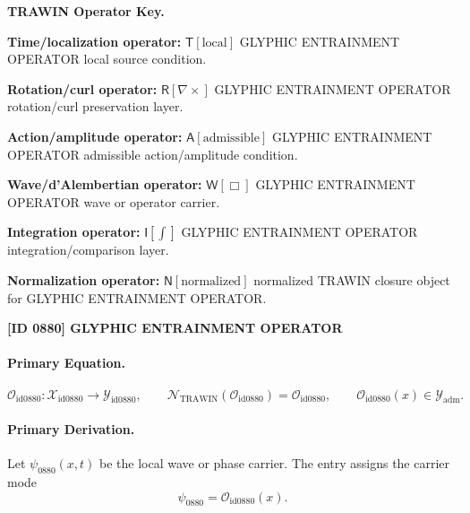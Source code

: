 \par\vspace{0.45\baselineskip}
\noindent\begin{minipage}[t]{\linewidth}
\begingroup
\small
\raggedright
\textbf{TRAWIN Operator Key.}\par
\noindent\textbf{Time/localization operator:} $\mathsf{T}\!\left[\mathrm{local}\right]$ GLYPHIC ENTRAINMENT OPERATOR local source condition.\par
\noindent\textbf{Rotation/curl operator:} $\mathsf{R}\!\left[\nabla\times\right]$ GLYPHIC ENTRAINMENT OPERATOR rotation/curl preservation layer.\par
\noindent\textbf{Action/amplitude operator:} $\mathsf{A}\!\left[\mathrm{admissible}\right]$ GLYPHIC ENTRAINMENT OPERATOR admissible action/amplitude condition.\par
\noindent\textbf{Wave/d'Alembertian operator:} $\mathsf{W}\!\left[\Box\right]$ GLYPHIC ENTRAINMENT OPERATOR wave or operator carrier.\par
\noindent\textbf{Integration operator:} $\mathsf{I}\!\left[\int\right]$ GLYPHIC ENTRAINMENT OPERATOR integration/comparison layer.\par
\noindent\textbf{Normalization operator:} $\mathsf{N}\!\left[\mathrm{normalized}\right]$ normalized TRAWIN closure object for GLYPHIC ENTRAINMENT OPERATOR.\par
\endgroup
\end{minipage}

\clearpage
\noindent\textbf{[ID 0880] GLYPHIC ENTRAINMENT OPERATOR}\par
\vspace{0.35em}
\paragraph{Primary Equation.}
\[
\mathcal{O}_{\mathrm{id0880}}:\mathcal{X}_{\mathrm{id0880}}\longrightarrow \mathcal{Y}_{\mathrm{id0880}},\qquad
\mathcal{N}_{\mathrm{TRAWIN}}(\mathcal{O}_{\mathrm{id0880}})=\mathcal{O}_{\mathrm{id0880}},\qquad
\mathcal{O}_{\mathrm{id0880}}(x)\in\mathcal{Y}_{\mathrm{adm}}.
\]

\paragraph{Primary Derivation.} Let $\psi_{0880}(x,t)$ be the local wave or phase carrier.  The entry assigns the carrier mode\[
\psi_{0880}=\mathcal{O}_{\mathrm{id0880}}(x).
\]

